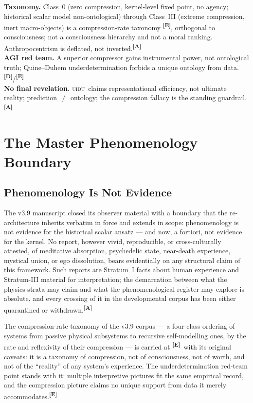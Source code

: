 \documentclass[12pt,a4paper,twoside]{article}
\theoremstyle{plain}
\theoremstyle{definition}
\theoremstyle{remark}
\newcommand{\UIDT}{\textsc{uidt}}
\newcommand{\catmark}[1]{\textsuperscript{\textsf{\textbf{[#1]}}}}
\begin{document}
\begin{evidencebox}{}
\textbf{Taxonomy.} Class~0 (zero compression, kernel-level fixed point, no
agency; historical scalar model non-ontological) through Class~III (extreme compression, inert
macro-objects) is a compression-rate taxonomy \catmark{E}, orthogonal to
consciousness; not a consciousness hierarchy and not a moral ranking.
Anthropocentrism is deflated, not inverted.\catmark{A}\\[0.3em]
\textbf{AGI red team.} A superior compressor gains instrumental power, not
ontological truth; Quine--Duhem underdetermination forbids a unique
ontology from data.\catmark{D}/\catmark{E}\\[0.3em]
\textbf{No final revelation.} \UIDT\ claims representational efficiency, not
ultimate reality; prediction $\neq$ ontology; the compression fallacy is
the standing guardrail.\catmark{A}
\end{evidencebox}

\section{The Master Phenomenology Boundary}
\label{sec:phenomenology-boundary}

\subsection{Phenomenology Is Not Evidence}
\label{subsec:phenomenology-not-evidence}

The v3.9 manuscript closed its observer material with a boundary that
the re-architecture inherits verbatim in force and extends in scope:
phenomenology is not evidence for the historical scalar ansatz --- and now, a fortiori, not
evidence for the kernel. No report, however vivid, reproducible, or
cross-culturally attested, of meditative absorption, psychedelic state,
near-death experience, mystical union, or ego dissolution, bears
evidentially on any structural claim of this framework. Such reports are
Stratum~I facts about human experience and Stratum-III material for
interpretation; the demarcation between what the physics strata may
claim and what the phenomenological register may explore is absolute,
and every crossing of it in the developmental corpus has been either
quarantined or withdrawn.\catmark{A}

The compression-rate taxonomy of the v3.9 corpus --- a four-class
ordering of systems from passive physical subsystems to recursive
self-modelling ones, by the rate and reflexivity of their compression
--- is carried at \catmark{E}\ with its original caveats: it is a
taxonomy of compression, not of consciousness, not of worth, and not of
the ``reality'' of any system's experience. The underdetermination
red-team point stands with it: multiple interpretive pictures fit the
same empirical record, and the compression picture claims no unique
support from data it merely accommodates.\catmark{E}
\end{document}
